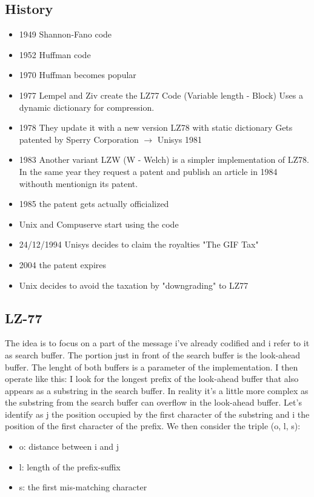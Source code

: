     \subsection*{History}
    \begin{itemize}
        \item 1949 Shannon-Fano code
        \item 1952 Huffman code
        \item 1970 Huffman becomes popular
        \item 1977 Lempel and Ziv create the LZ77 Code (Variable length - Block)
        Uses a dynamic dictionary for compression.
        \item 1978 They update it with a new version LZ78 with static dictionary
        Gets patented by Sperry Corporation $\rightarrow$ Unisys 1981
        \item 1983 Another variant LZW (W - Welch) is a simpler implementation of LZ78. In the same year they request a patent and publish an article in 1984 withouth mentionign its patent.
        \item 1985 the patent gets actually officialized
        \item Unix and Compuserve start using the code
        \item 24/12/1994 Unisys decides to claim the royalties "The GIF Tax"
        \item 2004 the patent expires
        \item Unix decides to avoid the taxation by "downgrading" to LZ77
    \end{itemize}
    
    \subsection*{LZ-77}
    The idea is to focus on a part of the message i've already codified and i refer to it as search buffer.
    The portion just in front of the search buffer is the look-ahead buffer. The lenght of both buffers is a parameter of the implementation.
    I then operate like this: I look for the longest prefix of the look-ahead buffer that also appears as a substring in the search buffer.
    In reality it's a little more complex as the substring from the search buffer can overflow in the look-ahead buffer.
    Let's identify as j the position occupied by the first character of the substring and i the position of the first character of the prefix.
    We then consider the triple (o, l, s): 
    \begin{itemize}
        \item o: distance between i and j
        \item l: length of the prefix-suffix
        \item s: the first mis-matching character
    \end{itemize}
